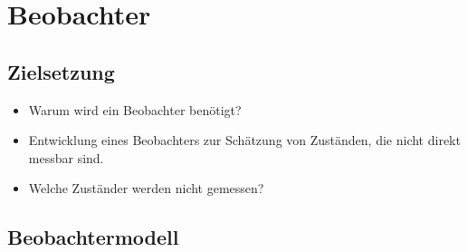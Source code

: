 \chapter{Beobachter}
\section{Zielsetzung}
\begin{itemize}
    \item Warum wird ein Beobachter benötigt?
    \item Entwicklung eines Beobachters zur Schätzung von Zuständen, die nicht direkt messbar sind.
    \item Welche Zuständer werden nicht gemessen?
\end{itemize}
\section{Beobachtermodell}
